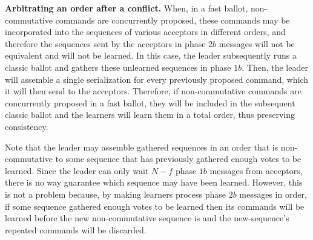 \noindent \textbf{Arbitrating an order after a conflict.} When, in a fast ballot, non-commutative commands are  concurrently proposed, these commands may be incorporated into the sequences of various acceptors in different orders, and therefore the sequences sent by the acceptors in phase $2b$ messages will not be equivalent and will not be learned. In this case, the leader subsequently runs a classic ballot and gathers these unlearned sequences in phase $1b$. Then, the leader will assemble a single serialization for every previously proposed command, which it will then send to the acceptors. Therefore, if non-commutative commands are concurrently proposed in a fast ballot, they will be included in the subsequent classic ballot and the learners will learn them in a total order, thus preserving consistency. \par 
Note that the leader may assemble gathered sequences in an order that is non-commutative to some sequence that has previously gathered enough votes to be learned. Since the leader can only wait $N-f$ phase $1b$ messages from acceptors, there is no way guarantee which sequence may have been learned. However, this is not a problem because, by making learners process phase $2b$ messages in order, if some sequence gathered enough votes to be learned then its commands will be learned before the new non-commutative sequence is and the new-sequence's repeated commands will be discarded.